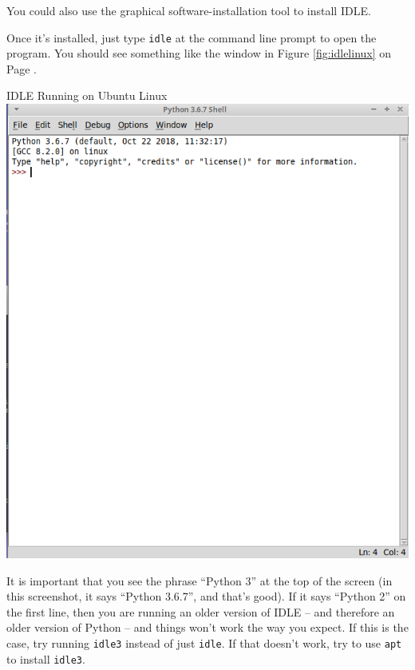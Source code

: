 You could also use the graphical software-installation tool to install IDLE.

Once it's installed, just type \verb-idle- at the command line prompt to open the program.  You should see something like the window in Figure \ref{fig:idlelinux} on Page \pageref{fig:idlelinux}.

\begin{myfigure}[label=fig:idlelinux]{IDLE Running on Ubuntu Linux}
    \centering
    \includegraphics[scale=0.6]{screenshots/idlelinux.png}
\end{myfigure}

It is important that you see the phrase ``Python 3'' at the top of the screen (in this screenshot, it says ``Python 3.6.7'', and that's good).  If it says ``Python 2'' on the first line, then you are running an older version of IDLE -- and therefore an older version of Python -- and things won't work the way you expect.  If this is the case, try running \verb-idle3- instead of just \verb-idle-.  If that doesn't work, try to use \verb-apt- to install \verb-idle3-.